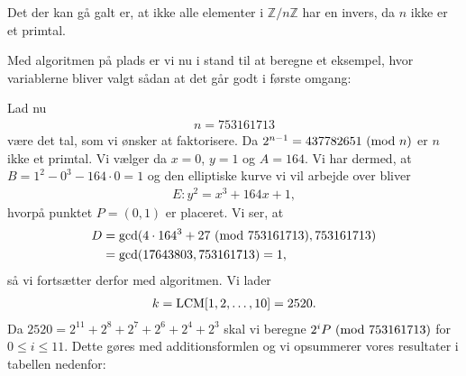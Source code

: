 Det der kan gå galt er, at ikke alle elementer i $\mathbb{Z}/n\mathbb{Z}$ har en invers, da $n$ ikke er et primtal.

Med algoritmen på plads er vi nu i stand til at beregne et eksempel, hvor variablerne bliver valgt sådan at det går godt i første omgang:


\begin{example}
Lad nu 
\begin{align*}
	n = 753161713
\end{align*}
være det tal, som vi ønsker at faktorisere. Da $2^{n-1} = 437782651 \ (\mathrm{mod} \ n)$ er $n$ ikke et primtal. Vi vælger da
$x = 0$, $y = 1$ og $A=164$. Vi har dermed, at $B = 1^2 - 0^3 - 164 \cdot 0 = 1$ og den elliptiske kurve vi vil arbejde over bliver
\begin{align*}
	E : y^2 = x^3 + 164x + 1,
\end{align*}
hvorpå punktet $P=(0, 1)$ er placeret. Vi ser, at 
\begin{align*}
	D &= \gcd(4 \cdot 164^3 + 27 \ (\mathrm{mod} \ 753161713), 753161713) \\ &= \gcd(17643803, 753161713) = 1,
\end{align*}
så vi fortsætter derfor med algoritmen. Vi lader
\begin{align*}
	k = \mathrm{LCM}[1, 2, \ldots, 10] = 2520.
\end{align*}
Da $2520 = 2^{11} + 2^8 + 2^7 + 2^6 + 2^4 + 2^3$ skal vi beregne $2^i P \ (\mathrm{mod} \ 753161713)$ for $0 \leq i \leq 11$. Dette gøres med additionsformlen og vi opsummerer vores resultater i tabellen nedenfor:


\end{example}
